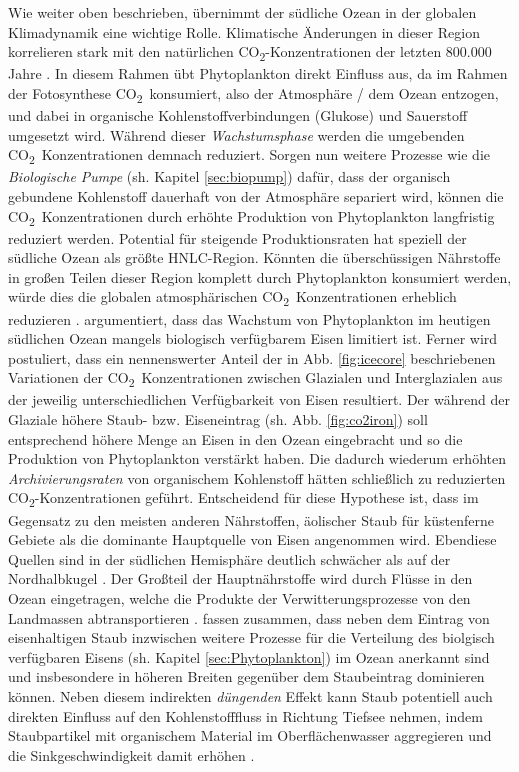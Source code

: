 \documentclass[12pt,a4paper,onecolumn]{scrartcl}
\newcommand{\cotwo}{CO\textsubscript{2}}
\begin{document}
Wie weiter oben beschrieben, übernimmt der südliche Ozean in der globalen Klimadynamik eine wichtige Rolle. Klimatische Änderungen in dieser Region korrelieren stark mit den natürlichen \cotwo -Konzentrationen der letzten 800.000 Jahre \citep{Fischer.2010}. In diesem Rahmen übt Phytoplankton direkt Einfluss aus, da im Rahmen der Fotosynthese \cotwo \ konsumiert, also der Atmosphäre / dem Ozean entzogen, und dabei in organische Kohlenstoffverbindungen (Glukose) und Sauerstoff umgesetzt wird. Während dieser \textit{Wachstumsphase} werden die umgebenden \cotwo \ Konzentrationen demnach reduziert. Sorgen nun weitere Prozesse wie die \textit{Biologische Pumpe} (sh. Kapitel \ref{sec:biopump}) dafür, dass der organisch gebundene Kohlenstoff dauerhaft von der Atmosphäre separiert wird, können die \cotwo \ Konzentrationen durch erhöhte Produktion von Phytoplankton langfristig reduziert werden. Potential für steigende Produktionsraten hat speziell der südliche Ozean als größte HNLC-Region. Könnten die überschüssigen Nährstoffe in großen Teilen dieser Region komplett durch Phytoplankton konsumiert werden, würde dies die globalen atmosphärischen \cotwo \ Konzentrationen erheblich reduzieren \citep{Martin.1990}. \citet{Martin.1990} argumentiert, dass das Wachstum von Phytoplankton im heutigen südlichen Ozean mangels biologisch verfügbarem Eisen limitiert ist. Ferner wird postuliert, dass ein nennenswerter Anteil der in Abb. \ref{fig:icecore} beschriebenen Variationen der \cotwo \ Konzentrationen zwischen Glazialen und Interglazialen aus der jeweilig unterschiedlichen Verfügbarkeit von Eisen resultiert. Der während der Glaziale höhere Staub- bzw. Eiseneintrag (sh. Abb. \ref{fig:co2iron}) soll entsprechend höhere Menge an Eisen in den Ozean eingebracht und so die Produktion von Phytoplankton verstärkt haben. Die dadurch wiederum erhöhten \textit{Archivierungsraten} von organischem Kohlenstoff hätten schließlich zu reduzierten \cotwo-Konzentrationen geführt. Entscheidend für diese Hypothese ist, dass im Gegensatz zu den meisten anderen Nährstoffen, äolischer Staub für küstenferne Gebiete als die dominante Hauptquelle von Eisen angenommen wird. Ebendiese Quellen sind in der südlichen Hemisphäre deutlich schwächer als auf der Nordhalbkugel \citep{Shao.2011}. Der Großteil der Hauptnährstoffe wird durch Flüsse in den Ozean eingetragen, welche die Produkte der Verwitterungsprozesse von den Landmassen abtransportieren \citep{Emerson.2009}. \citet{Tagliabue.2017} fassen zusammen, dass neben dem Eintrag von eisenhaltigen Staub inzwischen weitere Prozesse für die Verteilung des biolgisch verfügbaren Eisens (sh. Kapitel \ref{sec:Phytoplankton}) im Ozean anerkannt sind und insbesondere in höheren Breiten gegenüber dem Staubeintrag dominieren können. Neben diesem indirekten \textit{düngenden} Effekt kann Staub potentiell auch direkten Einfluss auf den Kohlenstofffluss in Richtung Tiefsee nehmen, indem Staubpartikel mit organischem Material im Oberflächenwasser aggregieren und die Sinkgeschwindigkeit damit  erhöhen \citep{vanderJagt.2018} . \\
\end{document}
